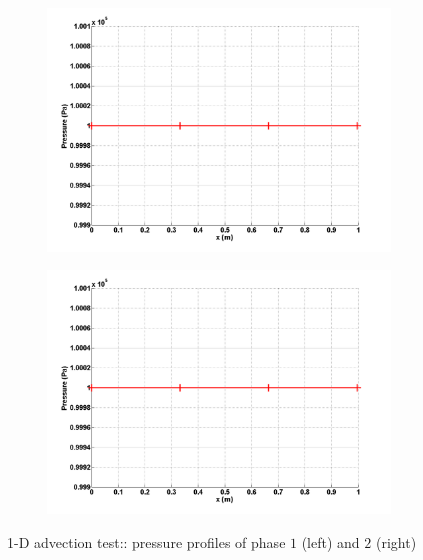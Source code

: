 %
\begin{figure}[H]
        \centering
        \begin{subfigure}[b]{0.495\textwidth}
                \centering
                \includegraphics[width=\textwidth]{figures/SEM/liquid_pressure.png}
                \caption{\label{fig:press-1-7-eqn-sect4}}
        \end{subfigure}%
        \begin{subfigure}[b]{0.495\textwidth}
                \centering
                \includegraphics[width=\textwidth]{figures/SEM/vapor_pressure.png}
                \caption{\label{fig:press-2-7-eqn-sect4}}
        \end{subfigure}
        \caption{1-D advection test:: pressure profiles of phase $1$ (left) and $2$ (right)\label{fig:press-7-sect4}}
\end{figure}
